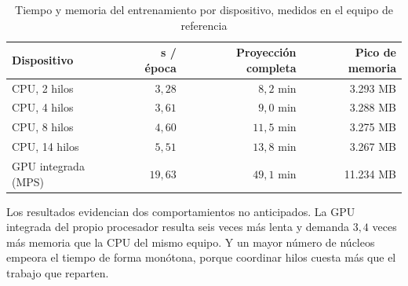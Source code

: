 \documentclass[11pt,a4paper]{article}
\begin{document}
\begin{table}[H]
\centering
\caption{Tiempo y memoria del entrenamiento por dispositivo, medidos en el equipo de referencia}
\label{tab:dispositivo}
\small
\begin{tabularx}{\textwidth}{X r r r}
\toprule
\textbf{Dispositivo} & \textbf{s / época} & \textbf{Proyección completa} & \textbf{Pico de memoria} \\
\midrule
CPU, 2 hilos  & $3{,}28$  & $8{,}2$ min  & 3.293 MB \\
CPU, 4 hilos  & $3{,}61$  & $9{,}0$ min  & 3.288 MB \\
CPU, 8 hilos  & $4{,}60$  & $11{,}5$ min & 3.275 MB \\
CPU, 14 hilos & $5{,}51$  & $13{,}8$ min & 3.267 MB \\
GPU integrada (MPS) & $19{,}63$ & $49{,}1$ min & 11.234 MB \\
\bottomrule
\end{tabularx}
\end{table}

Los resultados evidencian dos comportamientos no anticipados. La GPU integrada del propio
procesador resulta seis veces más lenta y demanda $3{,}4$ veces más memoria que la CPU del mismo
equipo. Y un mayor número de núcleos empeora el tiempo de forma monótona, porque coordinar
hilos cuesta más que el trabajo que reparten.
\end{document}
